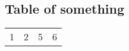 \documentclass{article}%
\begin{document}
%
\normalsize%
\subsection{Table of something}%
\label{subsec:Tableofsomething}%
\begin{tabular}{rc|cl}%
\hline%
1&2&5&6\\%
\end{tabular}

%
\end{document}
